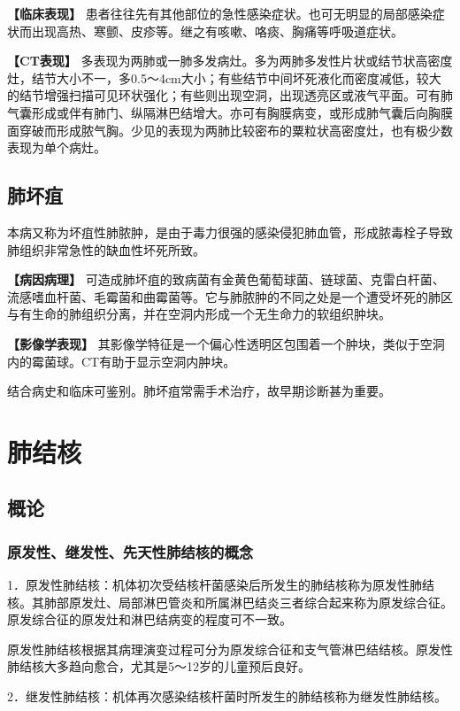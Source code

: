 \textbf{【临床表现】}
患者往往先有其他部位的急性感染症状。也可无明显的局部感染症状而出现高热、寒颤、皮疹等。继之有咳嗽、咯痰、胸痛等呼吸道症状。

\textbf{【CT表现】}
多表现为两肺或一肺多发病灶。多为两肺多发性片状或结节状高密度灶，结节大小不一，多0.5～4cm大小；有些结节中间坏死液化而密度减低，较大的结节增强扫描可见环状强化；有些则出现空洞，出现透亮区或液气平面。可有肺气囊形成或伴有肺门、纵隔淋巴结增大。亦可有胸膜病变，或形成肺气囊后向胸膜面穿破而形成脓气胸。少见的表现为两肺比较密布的粟粒状高密度灶，也有极少数表现为单个病灶。

\subsection{肺坏疽}

本病又称为坏疽性肺脓肿，是由于毒力很强的感染侵犯肺血管，形成脓毒栓子导致肺组织非常急性的缺血性坏死所致。

\textbf{【病因病理】}
可造成肺坏疽的致病菌有金黄色葡萄球菌、链球菌、克雷白杆菌、流感嗜血杆菌、毛霉菌和曲霉菌等。它与肺脓肿的不同之处是一个遭受坏死的肺区与有生命的肺组织分离，并在空洞内形成一个无生命力的软组织肿块。

\textbf{【影像学表现】}
其影像学特征是一个偏心性透明区包围着一个肿块，类似于空洞内的霉菌球。CT有助于显示空洞内肿块。

结合病史和临床可鉴别。肺坏疽常需手术治疗，故早期诊断甚为重要。

\section{肺结核}

\subsection{概论}

\subsubsection{原发性、继发性、先天性肺结核的概念}

1．原发性肺结核：机体初次受结核杆菌感染后所发生的肺结核称为原发性肺结核。其肺部原发灶、局部淋巴管炎和所属淋巴结炎三者综合起来称为原发综合征。原发综合征的原发灶和淋巴结病变的程度可不一致。

原发性肺结核根据其病理演变过程可分为原发综合征和支气管淋巴结结核。原发性肺结核大多趋向愈合，尤其是5～12岁的儿童预后良好。

2．继发性肺结核：机体再次感染结核杆菌时所发生的肺结核称为继发性肺结核。

